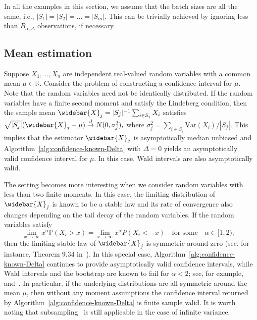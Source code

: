 \documentclass{article}
\numberwithin{myalgctr}{section}
\begin{document}
{\color{black}In all the examples in this section, we assume that the batch sizes are all the same, i.e., $|S_1| = |S_2| = \ldots = |S_m|$. This can be trivially achieved by ignoring less than $B_{\alpha, \Delta}$ observations, if necessary.}

\subsection{Mean estimation}\label{subsec:mean-estimation}
Suppose $X_1, \ldots, X_n$ are independent real-valued random variables with a common mean $\mu\in\mathbb{R}$. Consider the problem of constructing a confidence interval for $\mu$. Note that the random variables need not be identically distributed. If the random variables have a finite second moment and satisfy the Lindeberg condition, then the sample mean $\widebar{X}_{j} = |S_j|^{-1}\sum_{i\in S_j} X_i$ satisfies
$\sqrt{|S_j|}(\widebar{X}_j - \mu) \overset{d}{\to} N(0, \sigma_j^2),$ where $\sigma_j^2 = \sum_{i\in S_j}\mbox{Var}(X_i)/{|S_j|}$.
This implies that the estimator $\widebar{X}_j$ is asymptotically median unbiased and Algorithm~\ref{alg:confidence-known-Delta} with $\Delta = 0$ yields an asymptotically valid confidence interval for $\mu$. In this case, Wald intervals {\color{black}are also asymptotically valid.}

The setting becomes more interesting when we consider random variables with less than two finite moments. In this case, the limiting distribution of $\widebar{X}_j$ is known to be a stable law and its rate of convergence also changes depending on the tail decay of the random variables. 
If the random variables satisfy 
\begin{equation}\label{eq:symmetric-stable-law}
\lim_{x\to\infty} x^{\alpha}\mathbb{P}(X_i > x) = \lim_{x\to\infty}x^{\alpha}P(X_i < -x)\quad\mbox{for some}\quad\alpha\in[1, 2),
\end{equation} 
then the limiting stable law of $\widebar{X}_j$ is symmetric around zero (see, for instance, Theorem 9.34 in~\cite{breiman1968probability}). In this special case, Algorithm~\ref{alg:confidence-known-Delta} continues to provide asymptotically valid confidence intervals, while Wald intervals and the bootstrap are known to fail for $\alpha < 2$; see, for example,~\cite{athreya1987bootstrap} and~\cite{knight1989bootstrap}. In particular, if the underlying distributions are all symmetric around the mean $\mu$, then without any moment assumptions the confidence interval returned by Algorithm~\ref{alg:confidence-known-Delta} is finite sample valid.
It is worth noting that subsampling~\citep{romano1999subsampling} is still applicable in the case of infinite variance.
\end{document}

